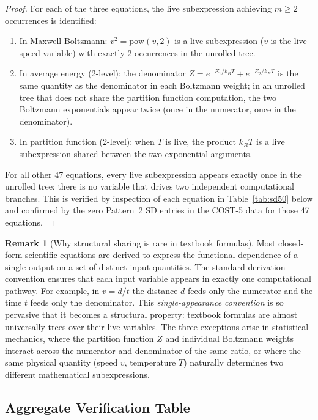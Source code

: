 \documentclass[12pt,a4paper]{article}
\theoremstyle{definition}
\newtheorem{remark}[theorem]{Remark}
\begin{document}
\begin{proof}
For each of the three equations, the live subexpression achieving
$m \geq 2$ occurrences is identified:
\begin{enumerate}[nosep]
  \item In Maxwell-Boltzmann: $v^2 = \mathrm{pow}(v, 2)$ is a live
        subexpression ($v$ is the live speed variable) with exactly
        2 occurrences in the unrolled tree.
  \item In average energy (2-level): the denominator $Z = e^{-E_1/k_BT} +
        e^{-E_2/k_BT}$ is the same quantity as the denominator in each
        Boltzmann weight; in an unrolled tree that does not share the
        partition function computation, the two Boltzmann exponentials
        appear twice (once in the numerator, once in the denominator).
  \item In partition function (2-level): when $T$ is live, the
        product $k_B T$ is a live subexpression shared between the two
        exponential arguments.
\end{enumerate}
For all other 47 equations, every live subexpression appears exactly once
in the unrolled tree: there is no variable that drives two independent
computational branches.  This is verified by inspection of each equation in
Table~\ref{tab:sd50} below and confirmed by the zero Pattern~2 SD entries
in the COST-5 data for those 47 equations.
\end{proof}

\begin{remark}[Why structural sharing is rare in textbook formulas]
Most closed-form scientific equations are derived to express the functional
dependence of a single output on a set of distinct input quantities.
The standard derivation convention ensures that each input variable appears
in exactly one computational pathway.  For example, in $v = d/t$ the
distance $d$ feeds only the numerator and the time $t$ feeds only the
denominator.  This \emph{single-appearance convention} is so pervasive that
it becomes a structural property: textbook formulas are almost universally
trees over their live variables.  The three exceptions arise in statistical
mechanics, where the partition function $Z$ and individual Boltzmann weights
interact across the numerator and denominator of the same ratio, or where
the same physical quantity (speed $v$, temperature $T$) naturally determines
two different mathematical subexpressions.
\end{remark}

\subsection{Aggregate Verification Table}
\end{document}
